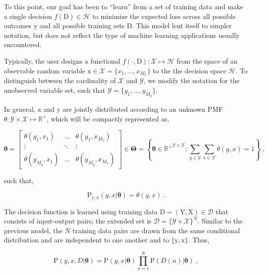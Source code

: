 \documentclass[12pt]{report}
\begin{document}
To this point, our goal has been to ``learn'' from a set of training data and make a single decision $f(\mathrm{D}) \in \mathcal{H}$ to minimize the expected loss across all possible outcomes $\mathrm{y}$ and all possible training sets $\mathrm{D}$. This model lent itself to simpler notation, but does not reflect the type of machine learning applications usually encountered. 

Typically, the user designs a functional $f(\cdot,\mathrm{D}): \mathcal{X} \mapsto \mathcal{H}$ from the space of an observable random variable $\mathrm{x} \in \mathcal{X} = \{x_1,\ldots,x_{M_x}\}$ to the the decision space $\mathcal{H}$. To distinguish between the cardinality of $\mathcal{X}$ and $\mathcal{Y}$, we modify the notation for the unobserved variable set, such that $\mathcal{Y} = \{y_1,\ldots,y_{M_y}\}$. 

In general, $\mathrm{x}$ and $\mathrm{y}$ are jointly distributed according to an unknown PMF $\theta : \mathcal{Y} \times \mathcal{X} \mapsto \mathbb{R}^+$, which will be compactly represented as,

\begin{equation}
\bm{\theta} = \begin{bmatrix} \theta(y_1,x_1) & \ldots & \theta(y_1,x_{M_x}) \\ \vdots & \ddots & \vdots \\ \theta(y_{M_y},x_1) & \ldots & \theta(y_{M_y},x_{M_x}) \end{bmatrix} 
\in \bm{\Theta} = \left\{ \bm{\theta} \in {\mathbb{R}^+}^{\mathcal{Y} \times \mathcal{X}}: \sum_{y \in \mathcal{Y}} \sum_{x \in \mathcal{X}}  \theta(y,x) = 1 \right\} \;,
\end{equation}

such that,

\begin{equation}
\text{P}_{\mathrm{y},\mathrm{x}}(y,x | \bm{\theta}) = \theta(y,x) \;.
\end{equation}

The decision function is learned using training data $\mathrm{D} = ( \mathrm{Y},\mathrm{X} ) \in \mathcal{D}$ that consists of input-output pairs; the extended set is $\mathcal{D} = \{\mathcal{Y} \times \mathcal{X}\}^N$. Similar to the previous model, the $N$ training data pairs are drawn from the same conditional distribution and are independent to one another and to $\{\mathrm{y},\mathrm{x}\}$. Thus,

\begin{equation}
\text{P}(y,x,D | \bm{\theta}) = \text{P}(y,x | \bm{\theta}) \prod_{n=1}^N \text{P}(D(n) | \bm{\theta}) \;,
\end{equation}
\end{document}
